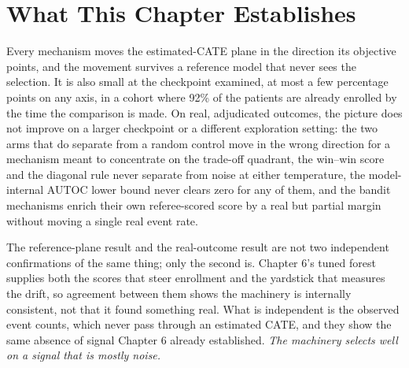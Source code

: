 \section{What This Chapter Establishes}

Every mechanism moves the estimated-CATE plane in the direction its objective points,
and the movement survives a reference model that never sees the selection. It is also
small at the checkpoint examined, at most a few percentage points on any axis, in a
cohort where 92\% of the patients are already enrolled by the time the comparison is
made. On real, adjudicated outcomes, the picture does not improve on a larger checkpoint
or a different exploration setting: the two arms that do separate from a random control
move in the wrong direction for a mechanism meant to concentrate on the trade-off
quadrant, the win--win score and the diagonal rule never separate from noise at either
temperature, the model-internal AUTOC lower bound never clears zero for any of them, and
the bandit mechanisms enrich their own referee-scored score by a real but partial margin
without moving a single real event rate.

\vspace{10pt}

The reference-plane result and the real-outcome result are not two independent
confirmations of the same thing; only the second is. Chapter 6's tuned forest supplies
both the scores that steer enrollment and the yardstick that measures the drift, so
agreement between them shows the machinery is internally consistent, not that it found
something real. What is independent is the observed event counts, which never pass
through an estimated CATE, and they show the same absence of signal Chapter 6 already
established. \emph{The machinery selects well on a signal that is mostly noise.}

